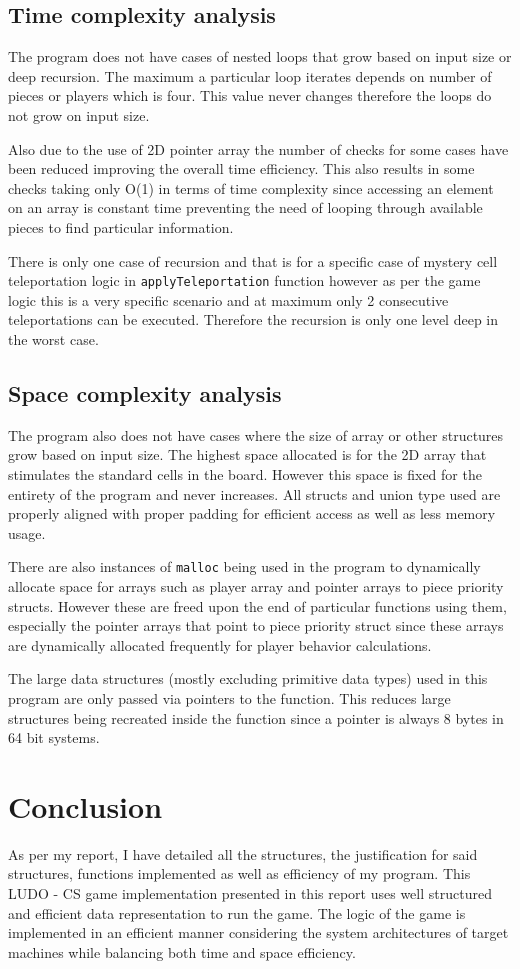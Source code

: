 \documentclass[12pt, a4paper]{report}
\begin{document}
\section{Time complexity analysis}
The program does not have cases of nested loops that grow based on input size or deep recursion. The maximum a particular loop iterates depends on number of pieces or players which is four. This value never changes therefore the loops do not grow on input size.

Also due to the use of 2D pointer array the number of checks for some cases have been reduced improving the overall time efficiency. This also results in some checks taking only O(1) in terms of time complexity since accessing an element on an array is constant time preventing the need of looping through available pieces to find particular information.

There is only one case of recursion and that is for a specific case of mystery cell teleportation logic in \lstinline|applyTeleportation| function however as per the game logic this is a very specific scenario and at maximum only 2 consecutive teleportations can be executed. Therefore the recursion is only one level deep in the worst case.

\section{Space complexity analysis}
The program also does not have cases where the size of array or other structures grow based on input size. The highest space allocated is for the 2D array that stimulates the standard cells in the board. However this space is fixed for the entirety of the program and never increases. All structs and union type used are properly aligned with proper padding for efficient access as well as less memory usage.

There are also instances of \lstinline|malloc| being used in the program to dynamically allocate space for arrays such as player array and pointer arrays to piece priority structs. However these are freed upon the end of particular functions using them, especially the pointer arrays that point to piece priority struct since these arrays are dynamically allocated frequently for player behavior calculations.

The large data structures (mostly excluding primitive data types) used in this program are only passed via pointers to the function. This reduces large structures being recreated inside the function since a pointer is always 8 bytes in 64 bit systems.

\chapter{Conclusion}
As per my report, I have detailed all the structures, the justification for said structures, functions implemented as well as efficiency of my program. This LUDO - CS game implementation presented in this report uses well structured and efficient data representation to run the game. The logic of the game is implemented in an efficient manner considering the system architectures of target machines while balancing both time and space efficiency.
\end{document}
